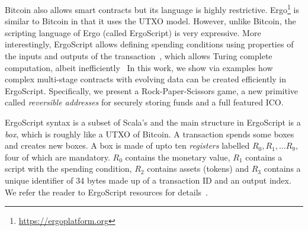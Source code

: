 \documentclass[runningheads]{llncs}
\newcommand{\langname}{ErgoScript\xspace}
\begin{document}
Bitcoin also allows smart contracts but its language is highly restrictive. Ergo\footnote{\url{https://ergoplatform.org}} is similar to Bitcoin in that it uses the UTXO model. However, unlike Bitcoin, the scripting language of Ergo (called \langname) is very expressive. More interestingly, \langname allows defining spending conditions using properties of the inputs and outputs of the transaction~\cite{tutorial}, which allows Turing complete computation, albeit inefficiently~\cite{CKM18a}
In this work, we show via examples how complex multi-stage contracts with evolving data can be created efficiently in \langname. Specifically, we present a Rock-Paper-Scissors game, a new primitive called {\em reversible addresses} for securely storing funds and a full featured ICO.  

\langname syntax is a subset of Scala's and the main structure in \langname is a \emph{box}, which is roughly like a UTXO of Bitcoin. A transaction spends some boxes and creates new boxes. A box is made of upto ten {\em registers} labelled $R_0, R_1,\ldots R_9$, four of which are mandatory. $R_0$ contains the monetary value, $R_1$ contains a script with the spending condition, $R_2$ contains assets (tokens) and $R_3$ contains a unique identifier of 34 bytes made up of a transaction ID and an output index. 
We refer the reader to \langname resources for details~\cite{langrepo,tutorial,advtutorial}.


%
%
\end{document}
